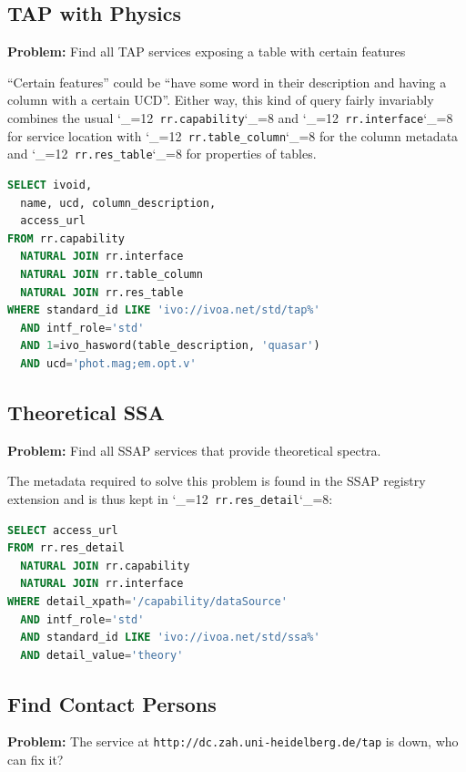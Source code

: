 \documentclass[11pt,a4paper]{ivoa}
\makeatletter
\def\rtent#1{\texttt{\color{rtcolor}\verb|#1|}}
\def\makeunderscoreletter{\catcode`\_=12}
\def\makeunderscoresubscript{\catcode`\_=8}
\def\rtent{\makeunderscoreletter\relax\rt@nt}
\def\rt@nt#1{\texttt{\color{rtcolor} #1}\makeunderscoresubscript{}}
\makeatother
\begin{document}
\subsection{TAP with Physics}

\textbf{Problem:} Find all TAP services
exposing a table with certain features

``Certain features'' could be ``have some word in their description
and having a column with a certain UCD''.  Either way, this kind of query
fairly invariably combines the usual
\rtent{rr.capability} and
\rtent{rr.interface}
 for service location with
\rtent{rr.table_column}
 for the column metadata
and
\rtent{rr.res_table} for properties of tables.


\begin{lstlisting}[language=SQL,flexiblecolumns=true]
SELECT ivoid,
  name, ucd, column_description,
  access_url
FROM rr.capability
  NATURAL JOIN rr.interface
  NATURAL JOIN rr.table_column
  NATURAL JOIN rr.res_table
WHERE standard_id LIKE 'ivo://ivoa.net/std/tap%'
  AND intf_role='std'
  AND 1=ivo_hasword(table_description, 'quasar')
  AND ucd='phot.mag;em.opt.v'
\end{lstlisting}

\subsection{Theoretical SSA}

\textbf{Problem:} Find all SSAP services that
provide theoretical spectra.

The metadata required to solve this problem is found in the SSAP
registry extension and is thus kept in
\rtent{rr.res_detail}:


\begin{lstlisting}[language=SQL,flexiblecolumns=true]
SELECT access_url
FROM rr.res_detail
  NATURAL JOIN rr.capability
  NATURAL JOIN rr.interface
WHERE detail_xpath='/capability/dataSource'
  AND intf_role='std'
  AND standard_id LIKE 'ivo://ivoa.net/std/ssa%'
  AND detail_value='theory'
\end{lstlisting}


\subsection{Find Contact Persons}

\textbf{Problem:} The service at
\texttt{http://dc.zah.uni-heidelberg.de/tap} is down, who can
fix it?
\end{document}
